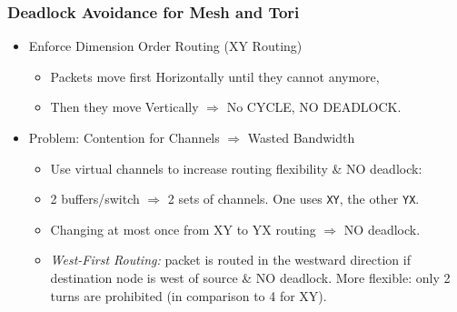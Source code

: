 \documentclass{beamer}
\renewcommand{\emph}[1]{\textcolor{structure}{#1}}
\newcommand{\emp}[1]{\textcolor{DikuRed}{ #1}}
\begin{document}
\begin{frame}[fragile,t]
\frametitle{Deadlock Avoidance for Mesh and Tori}

\vspace{-18ex}

\begin{itemize}
    \item \emp{Enforce Dimension Order Routing (XY Routing)}
    \begin{itemize}
        \item Packets move first Horizontally until they cannot anymore,
        \item Then they move Vertically $\Rightarrow$ \emph{No CYCLE, NO DEADLOCK}.
    \end  {itemize}\medskip

    \item \emp{Problem: Contention for Channels $\Rightarrow$ Wasted Bandwidth}
    \begin{itemize}
        \item \emph{Use virtual channels to increase routing flexibility \& NO deadlock}:
        \item 2 buffers/switch $\Rightarrow$ 2 sets of channels. One uses {\tt XY}, the other {\tt YX}.
        \item Changing at most once from XY to YX routing $\Rightarrow$ NO deadlock.
        \item \emp{\em West-First Routing:} packet is routed in the westward direction if
                destination node is west of source \& NO deadlock.
                \emph{More flexible: only 2 turns are prohibited} (in comparison to 4 for XY).  
    \end  {itemize}\medskip

\end  {itemize}


\end{frame}
\end{document}
